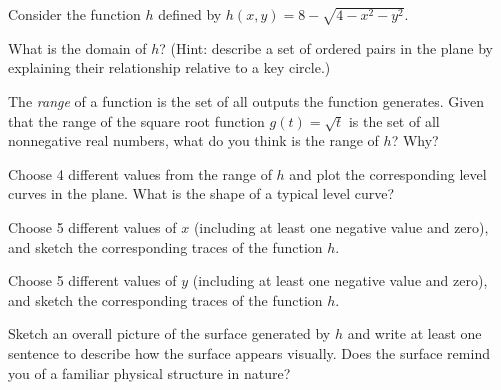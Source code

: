 \begin{exercises}
\item \label{Ez:9.1.3}   Consider the function $h$ defined by $h(x,y) = 8 - \sqrt{4 - x^2 - y^2} $.
    \ba
    \item What is the domain of $h$?  (Hint:  describe a set of ordered pairs in the plane by explaining their relationship relative to a key circle.)
    \item The \emph{range} of a function is the set of all outputs the function generates.  Given that the range of the square root function $g(t) = \sqrt{t}$ is the set of all nonnegative real numbers, what do you think is the range of $h$?  Why?
    \item Choose 4 different values from the range of $h$ and plot the corresponding level curves in the plane.  What is the shape of a typical level curve?
    \item Choose 5 different values of $x$ (including at least one negative value and zero), and sketch the corresponding traces of the function $h$.
    \item Choose 5 different values of $y$ (including at least one negative value and zero), and sketch the corresponding traces of the function $h$.
    \item Sketch an overall picture of the surface generated by $h$ and write at least one sentence to describe how the surface appears visually.  Does the surface remind you of a familiar physical structure in nature?
    \ea    



\end{exercises}
